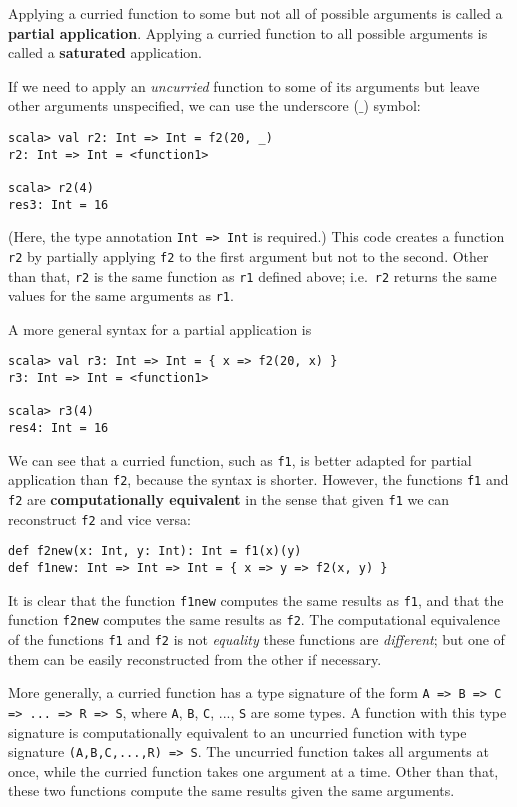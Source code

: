 Applying a curried function to some but not all of possible arguments
is called a \textbf{partial application}.
Applying a curried function to all possible arguments is called a
\textbf{saturated} application.

If we need to apply an \emph{uncurried} function to some of its arguments
but leave other arguments unspecified, we can use the underscore ($\_$)
symbol:
\begin{lstlisting}
scala> val r2: Int => Int = f2(20, _)
r2: Int => Int = <function1>

scala> r2(4)
res3: Int = 16
\end{lstlisting}
(Here, the type annotation \lstinline!Int => Int! is required.) This
code creates a function \lstinline!r2! by partially applying \lstinline!f2!
to the first argument but not to the second. Other than that, \lstinline!r2!
is the same function as \lstinline!r1! defined above; i.e.~\lstinline!r2!
returns the same values for the same arguments as \lstinline!r1!.

A more general syntax for a partial application is
\begin{lstlisting}
scala> val r3: Int => Int = { x => f2(20, x) }
r3: Int => Int = <function1>

scala> r3(4)
res4: Int = 16
\end{lstlisting}

We can see that a curried function, such as \lstinline!f1!, is better
adapted for partial application than \lstinline!f2!, because the
syntax is shorter. However, the functions \lstinline!f1! and \lstinline!f2!
are \textbf{computationally equivalent}
in the sense that given \lstinline!f1! we can reconstruct \lstinline!f2!
and vice versa:
\begin{lstlisting}
def f2new(x: Int, y: Int): Int = f1(x)(y)
def f1new: Int => Int => Int = { x => y => f2(x, y) }
\end{lstlisting}
It is clear that the function \lstinline!f1new! computes the same
results as \lstinline!f1!, and that the function \lstinline!f2new!
computes the same results as \lstinline!f2!. The computational equivalence
of the functions \lstinline!f1! and \lstinline!f2! is not \emph{equality}
 \textendash{}  these functions are \emph{different}; but one of them
can be easily reconstructed from the other if necessary. 

More generally, a curried function has a type signature of the form
\lstinline!A => B => C => ... => R => S!, where \lstinline!A!, \lstinline!B!,
\lstinline!C!, ..., \lstinline!S! are some types. A function with
this type signature is computationally equivalent to an uncurried
function with type signature \lstinline!(A,B,C,...,R) => S!. The
uncurried function takes all arguments at once, while the curried
function takes one argument at a time. Other than that, these two
functions compute the same results given the same arguments.

